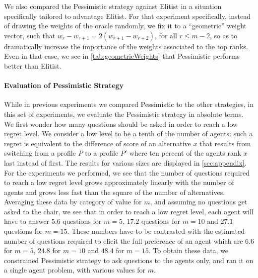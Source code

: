 \documentclass{article}
\begin{document}
We also compared the Pessimistic strategy against Elitist in a situation specifically tailored to advantage Elitist. For that experiment specifically, instead of drawing the weights of the oracle randomly, we fix it to a “geometric” weight vector, such that $w_r - w_{r + 1} = 2(w_{r + 1} - w_{r + 2})$, for all $r ≤ m - 2$, so as to dramatically increase the importance of the weights associated to the top ranks. Even in that case, we see in \cref{tab:geometricWeights} that Pessimistic performs better than Elitist.




\paragraph{Evaluation of Pessimistic Strategy}
\label{sec:lowRegret}
While in previous experiments we compared Pessimistic to the other strategies, in this set of experiments, we evaluate the Pessimistic strategy in absolute terms. 
We first wonder how many questions should be asked in order to reach a low regret level. We consider a low level to be a tenth of the number of agents: such a regret is equivalent to the difference of score of an alternative $x$ that results from switching from a profile $P$ to a profile $P'$ where ten percent of the agents rank $x$ last instead of first.
The results for various sizes are displayed in \cref{sec:appendix}. 
For the experiments we performed, we see that the number of questions required to reach a low regret level grows approximately linearly with the number of agents and grows less fast than the square of the number of alternatives. Averaging these data by category of value for $m$, and assuming no questions get asked to the chair, we see that in order to reach a low regret level, each agent will have to answer $5.6$ questions for $m = 5$, $17.2$ questions for $m = 10$ and $27.1$ questions for $m = 15$. These numbers have to be contrasted with the estimated number of questions required to elicit the full preference of an agent which are $6.6$ for $m=5$, $24.8$ for $m=10$ and $48.4$ for $m=15$. To obtain these data, we constrained Pessimistic strategy to ask questions to the agents only, and ran it on a single agent problem, with various values for $m$.

\end{document}
